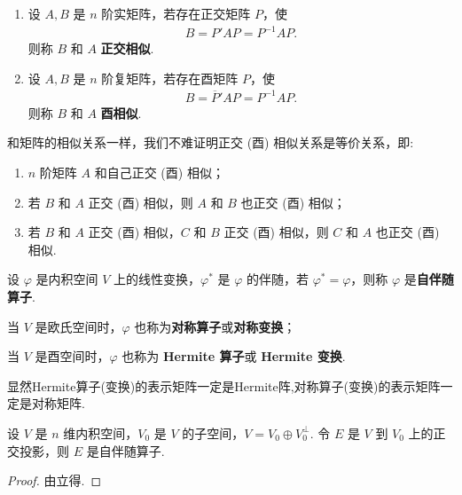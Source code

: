\documentclass[../../main.tex]{subfiles}
\begin{document}
\begin{definition}[正交相似和酉相似]
\begin{enumerate}
\item 设 $A,B$ 是 $n$ 阶实矩阵，若存在正交矩阵 $P$，使 
\begin{align*}
B = P'AP=P^{-1}AP.
\end{align*}
则称 $B$ 和 $A$ \textbf{正交相似}. 

\item 设 $A,B$ 是 $n$ 阶复矩阵，若存在酉矩阵 $P$，使 
\begin{align*}
B = \overline{P}'AP=P^{-1}AP.
\end{align*}
则称 $B$ 和 $A$ \textbf{酉相似}.
\end{enumerate}
\end{definition}
\begin{remark}
和矩阵的相似关系一样，我们不难证明正交 (酉) 相似关系是等价关系，即:
\begin{enumerate}
\item $n$ 阶矩阵 $A$ 和自己正交 (酉) 相似；

\item 若 $B$ 和 $A$ 正交 (酉) 相似，则 $A$ 和 $B$ 也正交 (酉) 相似；

\item 若 $B$ 和 $A$ 正交 (酉) 相似，$C$ 和 $B$ 正交 (酉) 相似，则 $C$ 和 $A$ 也正交 (酉) 相似. 
\end{enumerate}
\end{remark}

\begin{definition}[自伴随算子]
设 $\varphi$ 是内积空间 $V$ 上的线性变换，$\varphi^*$ 是 $\varphi$ 的伴随，若 $\varphi^* = \varphi$，则称 $\varphi$ 是\textbf{自伴随算子}. 

当 $V$ 是欧氏空间时，$\varphi$ 也称为\textbf{对称算子}或\textbf{对称变换}；

当 $V$ 是酉空间时，$\varphi$ 也称为 \textbf{Hermite 算子}或 \textbf{Hermite 变换}.
\end{definition}
\begin{remark}
显然Hermite算子(变换)的表示矩阵一定是Hermite阵,对称算子(变换)的表示矩阵一定是对称矩阵.
\end{remark}

\begin{proposition}
设 $V$ 是 $n$ 维内积空间，$V_0$ 是 $V$ 的子空间，$V = V_0 \oplus V_0^\perp$. 令 $E$ 是 $V$ 到 $V_0$ 上的正交投影，则 $E$ 是自伴随算子. 
\end{proposition}
\begin{proof}
由立得.

\end{proof}
\end{document}
